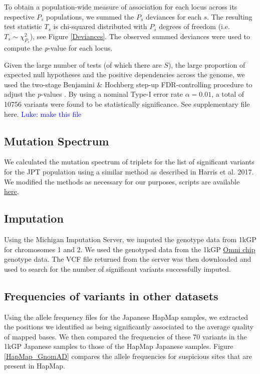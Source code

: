 \documentclass[9pt,lineno]{elife}
\newcommand{\luke}[1]{\textcolor{blue}{Luke: #1}}
\begin{document}
To obtain a population-wide measure of association for each locus across its respective $P_s$ populations, we summed the $P_s$ deviances for each $s$. The resulting test statistic $T_s$ is chi-squared distributed with $P_s$ degrees of freedom (i.e. $T_s \sim \chi^2_{P_s}$), see Figure \ref{Deviances}.
The observed summed deviances were used to compute the \textit{p}-value for each locus.


Given the large number of tests (of which there are $S$), the large proportion of expected null hypotheses and the positive dependencies across the genome, we used the two-stage Benjamini \& Hochberg step-up FDR-controlling procedure to adjust the \textit{p}-values \citep{Benjamini2006}.
By using a nominal Type-I error rate $\alpha = 0.01$, a total of 10756 variants were found to be statistically significance. See supplementary file {here}. \luke{make this file}

\subsection{Mutation Spectrum}
We calculated the mutation spectrum of triplets for the list of significant variants for the JPT population using a similar method as described in Harris et al. 2017. \citep{Harris2017a}
We modified the methods as necessary for our purposes, scripts are available \href{https://github.com/LukeAndersonTrocme/QualityPaper}{here}. 

\subsection{Imputation}
Using the Michigan Imputation Server, we imputed the genotype data from 1kGP for chromosomes 1 and 2.
We used the genotyped data from the 1kGP \href{ftp://ftp.1000genomes.ebi.ac.uk/vol1/ftp/release/20130502/supporting/hd_genotype_chip/ALL.chip.omni_broad_sanger_combined.20140818.snps.genotypes.vcf.gz}{Omni chip} genotype data.
The VCF file returned from the server was then downloaded and used to search for the number of significant variants successfully imputed. 

\subsection{Frequencies of variants in other datasets}
Using the allele frequency files for the Japanese HapMap samples, we extracted the positions we identified as being significantly associated to the average quality of mapped bases. We then compared the frequencies of these 70 variants in the 1kGP Japanese samples to those of the HapMap Japanese samples. Figure \ref{HapMap_GnomAD} compares the allele frequencies for suspicious sites that are present in HapMap.
\end{document}
